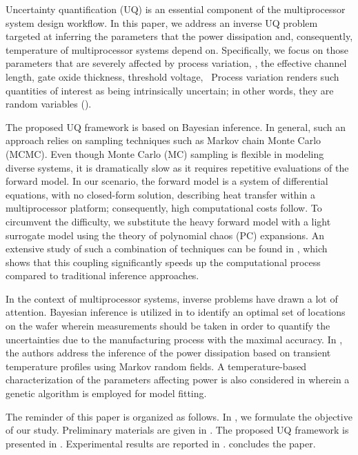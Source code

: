 Uncertainty quantification (UQ) is an essential component of the multiprocessor system design workflow. In this paper, we address an inverse UQ problem targeted at inferring the parameters that the power dissipation and, consequently, temperature of multiprocessor systems depend on. Specifically, we focus on those parameters that are severely affected by process variation, \eg, the effective channel length, gate oxide thickness, threshold voltage, \etc\ Process variation renders such quantities of interest as being intrinsically uncertain; in other words, they are random variables (\rvs).

The proposed UQ framework is based on Bayesian inference. In general, such an approach relies on sampling techniques such as Markov chain Monte Carlo (MCMC). Even though Monte Carlo (MC) sampling is flexible in modeling diverse systems, it is dramatically slow as it requires repetitive evaluations of the forward model. In our scenario, the forward model is a system of differential equations, with no closed-form solution, describing heat transfer within a multiprocessor platform; consequently, high computational costs follow. To circumvent the difficulty, we substitute the heavy forward model with a light surrogate model using the theory of polynomial chaos (PC) expansions. An extensive study of such a combination of techniques can be found in \cite{marzouk2007, el-moselhy2012}, which shows that this coupling significantly speeds up the computational process compared to traditional inference approaches.

In the context of multiprocessor systems, inverse problems have drawn a lot of attention. Bayesian inference is utilized in \cite{zhang2010} to identify an optimal set of locations on the wafer wherein measurements should be taken in order to quantify the uncertainties due to the manufacturing process with the maximal accuracy. In \cite{paek2012}, the authors address the inference of the power dissipation based on transient temperature profiles using Markov random fields. A temperature-based characterization of the parameters affecting power is also considered in \cite{mesa-martinez2007} wherein a genetic algorithm is employed for model fitting.

The reminder of this paper is organized as follows. In , we formulate the objective of our study. Preliminary materials are given in . The proposed UQ framework is presented in . Experimental results are reported in .  concludes the paper.
